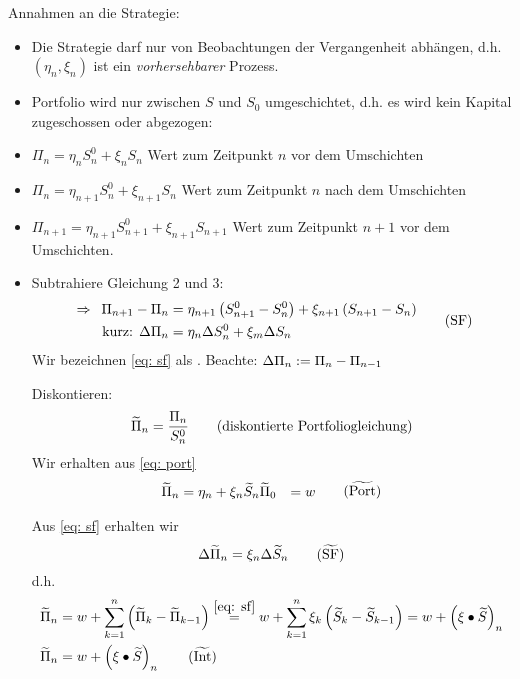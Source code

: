 Annahmen an die Strategie:
\begin{itemize}
	\item Die Strategie darf nur von Beobachtungen der Vergangenheit abhängen, d.h. $(\eta_n, \xi_n)$ ist ein \textit{vorhersehbarer} Prozess.
	\item Portfolio wird nur zwischen $S$ und $S_0$ umgeschichtet, d.h. es wird kein Kapital zugeschossen oder abgezogen:
	
	\item $\Pi_n = \eta_n S_n^0 + \xi_n S_n$ Wert zum Zeitpunkt $n$ vor dem Umschichten
	\item $\Pi_n = \eta_{n+1} S_n^0 + \xi_{n+1}S_n$ Wert zum Zeitpunkt $n$ nach dem Umschichten
	\item $\Pi_{n+1} = \eta_{n+1} S_{n+1}^0 + \xi_{n+1} S_{n+1}$ Wert zum Zeitpunkt $n+1$ vor dem Umschichten.
	
	\item Subtrahiere Gleichung 2 und 3: 
	\begin{equation}
		\begin{aligned}
			\enskip \Rightarrow \enskip \Pi_{n+1} - \Pi_n &= \eta_{n+1} \left( S_{n+1}^0 - S_n^0 \right) + \xi_{n+1} \left( S_{n+1} - S_n \right) \\
			\text{kurz: } \Delta \Pi_n &= \eta_n \Delta S_n^0 + \xi_m \Delta S_n
		\end{aligned}
		\tag{SF} \label{eq: sf}
	\end{equation}
	Wir bezeichnen \eqref{eq: sf} als . Beachte: $\Delta \Pi_n \mathrel{:=} \Pi_n - \Pi_{n-1}$
	
	Diskontieren:
	\begin{equation}
		\widetilde{\Pi}_n = \frac{\Pi_n}{S_n^0} 
		\tag{diskontierte Portfoliogleichung}
	\end{equation}
	Wir erhalten aus \eqref{eq: port}
	\begin{equation}
		\begin{aligned}
		\schlange{\Pi}_n &= \eta_n + \xi_n \schlange{S}_n
		\schlange{\Pi}_0 &= w
		\end{aligned}
		\tag{$\schlange{\text{Port}}$}
	\end{equation}
	
	Aus \eqref{eq: sf} erhalten wir
	\begin{equation}
		\Delta \schlange{\Pi}_n = \xi_n \Delta \schlange{S}_n
		\tag{$\schlange{\text{SF}}$}
	\end{equation}
	d.h.
	\begin{align}
			\schlange{\Pi}_n  &= w + \sum_{k=1}^n \brackets{\schlange\Pi_k - \schlange\Pi_{k-1} }
			\overset{\eqref{eq: sf}}{=} w + \sum_{k=1}^n \xi_k \brackets{\schlange S_k - \schlange S_{k-1}} 
			= w + \brackets{\xi \bullet \schlange{S}}_n \nonumber \\
			\schlange\Pi_n &= w + \brackets{\xi \bullet \schlange{S}}_n
			\tag{$\schlange{\text{Int}}$}
	\end{align}
\end{itemize}

